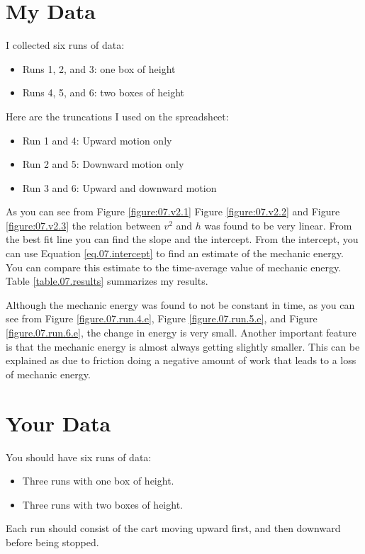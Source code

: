 \section{My Data}
I collected six runs of data:
\begin{itemize}
    \item Runs 1, 2, and 3: one box of height
    \item Runs 4, 5, and 6: two boxes of height
\end{itemize}
Here are the truncations I used on the spreadsheet:
\begin{itemize}
    \item Run 1 and 4: Upward motion only
    \item Run 2 and 5: Downward motion only
    \item Run 3 and 6: Upward and downward motion
\end{itemize}
As you can see from Figure \ref{figure:07.v2.1} Figure \ref{figure:07.v2.2} and Figure \ref{figure:07.v2.3} the relation between $v^{2}$ and $h$ was found to be very linear. From the best fit line you can find the slope and the intercept. From the intercept, you can use Equation \ref{eq.07.intercept} to find an estimate of the mechanic energy. You can compare this estimate to the time-average value of mechanic energy. Table \ref{table.07.results} summarizes my results.

Although the mechanic energy was found to not be constant in time, as you can see from Figure \ref{figure.07.run.4.e}, Figure \ref{figure.07.run.5.e}, and Figure \ref{figure.07.run.6.e}, the change in energy is very small. Another important feature is that the mechanic energy is almost always getting slightly smaller. This can be explained as due to friction doing a negative amount of work that leads to a loss of mechanic energy.
\section{Your Data}
You should have six runs of data:
\begin{itemize}
    \item Three runs with one box of height.
    \item Three runs with two boxes of height.
\end{itemize}
Each run should consist of the cart moving upward first, and then downward before being stopped.
\newpage
